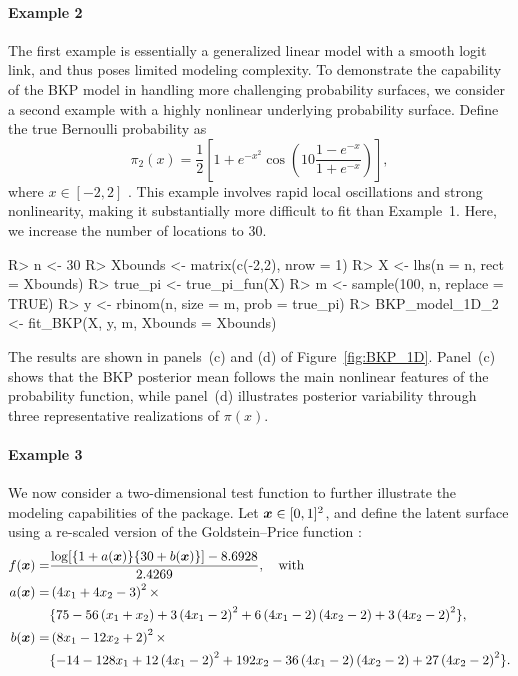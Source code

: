 \documentclass[article, shortnames]{jss}
\renewcommand{\vec}[1]{\mbox{\boldmath ${#1}$}}
\begin{document}
\paragraph{Example 2} The first example is essentially a generalized linear model with a smooth logit link, and thus poses limited modeling complexity. To demonstrate the capability of the BKP model in handling more challenging probability surfaces, we consider a second example with a highly nonlinear underlying probability surface. Define the true Bernoulli probability as
\begin{equation}\label{eq:bkp-1d-generate-function-2}
	\pi_{2}(x) = \frac{1}{2}\left[ 1+e^{-x^{2}}\cos \left( 10\frac{1-e^{-x}}{1+e^{-x}} \right) \right],
\end{equation}
where $x \in [-2,2]$  \citep{Goetschalckx:2011}. This example involves rapid local oscillations and strong nonlinearity, making it substantially more difficult to fit than Example~1. Here, we increase the number of locations to 30.

\begin{CodeChunk}
\begin{CodeInput} 
R> n <- 30
R> Xbounds <- matrix(c(-2,2), nrow = 1)
R> X <- lhs(n = n, rect = Xbounds)
R> true_pi <- true_pi_fun(X)
R> m <- sample(100, n, replace = TRUE)
R> y <- rbinom(n, size = m, prob = true_pi) 
R> BKP_model_1D_2 <- fit_BKP(X, y, m, Xbounds = Xbounds)
\end{CodeInput}
\end{CodeChunk}

The results are shown in panels~(c) and (d) of Figure~\ref{fig:BKP_1D}. Panel~(c) shows that the BKP posterior mean follows the main nonlinear features of the probability function, while panel~(d) illustrates posterior variability through three representative realizations of $\pi(x)$.

\paragraph{Example 3} We now consider a two-dimensional test function to further illustrate the modeling capabilities of the  package. Let $\vec{x} \in [0,1]^2$, and define the latent surface using a re-scaled version of the Goldstein–Price function \citep{Picheny2013Benchmark}:
\begin{align*}
	f(\vec{x})=& \frac{\log[\{1+a(\vec{x})\}\{30+b(\vec{x})\}]-8.6928}{2.4269}, \quad \text{with}\\
	a(\vec{x}) =& \left(4 x_1 + 4 x_2 - 3 \right)^2  \times  \notag  \\
	& \{75 - 56 \left(x_1 + x_2 \right) + 3\left(4 x_1 - 2 \right)^2 + 6\left(4 x_1 - 2 \right)\left(4 x_2 - 2 \right) + 3\left(4 x_2 - 2 \right)^2\}, \notag \\
	b(\vec{x}) =& \left(8 x_1 - 12 x_2 +2 \right)^2 \times \notag \\
	& \{-14 - 128 x_1 + 12\left(4 x_1 - 2 \right)^2 + 192 x_2 - 36\left(4 x_1 - 2 \right)\left(4 x_2 - 2 \right) + 27\left(4 x_2 - 2 \right)^2 \}.\notag 
\end{align*} 
\end{document}
